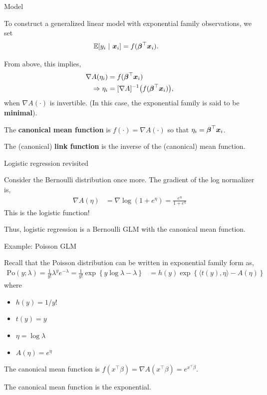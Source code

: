 \documentclass[aspectratio=169]{beamer}
\begin{document}
\begin{frame}[t,allowframebreaks]{Model}\label{model}

To construct a generalized linear model with exponential family
observations, we set \begin{align*}
    \mathbb{E}[y_i ~\vert~ \boldsymbol{x}_i] &= f(\boldsymbol{\beta}^\top \boldsymbol{x}_i).
\end{align*}

From above, this implies, \begin{align*}
    \nabla A(\eta_i) &= f(\boldsymbol{\beta}^\top \boldsymbol{x}_i) \\
    \Rightarrow \eta_i &= [\nabla A]^{-1} \big( f(\boldsymbol{\beta}^\top \boldsymbol{x}_i) \big),
\end{align*} when \(\nabla A(\cdot)\) is invertible. (In this case, the
exponential family is said to be \textbf{minimal}).

The \textbf{canonical mean function} is \(f(\cdot) = \nabla A(\cdot)\)
so that \(\eta_i = \boldsymbol{\beta}^\top \boldsymbol{x}_i\).

The (canonical) \textbf{link function} is the inverse of the (canonical)
mean function.
\end{frame}

\begin{frame}[t,allowframebreaks]{Logistic regression
revisited}\label{logistic-regression-revisited}

Consider the Bernoulli distribution once more. The gradient of the log
normalizer is, \begin{align*}
    \nabla A(\eta) &= \nabla \log (1 + e^\eta) 
    = \frac{e^\eta}{1+ e^\eta}
\end{align*} This is the logistic function!

Thus, logistic regression is a Bernoulli GLM with the canonical mean
function.
\end{frame}

\begin{frame}[t,allowframebreaks]{Example: Poisson GLM}\label{example-poisson-glm}

Recall that the Poisson distribution can be written in exponential
family form as, \begin{align*}
\mathrm{Po}(y; \lambda) 
= \frac{1}{y!} \lambda^y e^{-\lambda} 
= \frac{1}{y!} \exp \left\{ y \log \lambda - \lambda  \right\} 
&= h(y) \exp \left\{ \langle t(y), \eta \rangle - A(\eta) \right\} 
\end{align*} where 
\begin{itemize}
    \item \(h(y) = 1/y!\)
    \item \(t(y) = y\)
    \item \(\eta = \log \lambda\) 
    \item \(A(\eta) = e^\eta\)
\end{itemize}

The canonical mean function is
\(f(x^\top \beta) = \nabla A(x^\top \beta) = e^{x^\top \beta}\). 

The canonical mean function is the exponential.
\end{frame}
\end{document}
